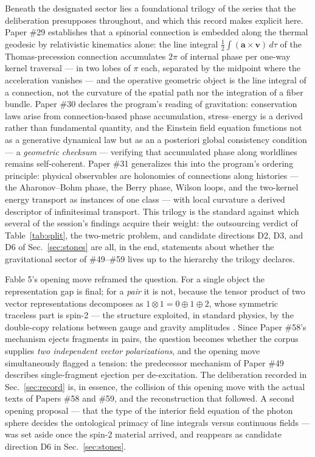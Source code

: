 \documentclass[%
 reprint, amsmath,amssymb, aps, prb, ]{revtex4-2}
\numberwithin{equation}{section}
\begin{document}
Beneath the designated sector lies a foundational trilogy of the series that the deliberation presupposes throughout, and which this record makes explicit here. Paper \#29 \cite{hanamura29} establishes that a spinorial connection is embedded along the thermal geodesic by relativistic kinematics alone: the line integral $\tfrac{1}{2}\int(\mathbf a\times\mathbf v)\,d\tau$ of the Thomas-precession connection accumulates $2\pi$ of internal phase per one-way kernel traversal --- in two lobes of $\pi$ each, separated by the midpoint where the acceleration vanishes --- and the operative geometric object is the line integral of a connection, not the curvature of the spatial path nor the integration of a fiber bundle. Paper \#30 \cite{hanamura30} declares the program's reading of gravitation: conservation laws arise from connection-based phase accumulation, stress--energy is a derived rather than fundamental quantity, and the Einstein field equation functions not as a generative dynamical law but as an a posteriori global consistency condition --- a \emph{geometric checksum} --- verifying that accumulated phase along worldlines remains self-coherent. Paper \#31 \cite{hanamura31} generalizes this into the program's ordering principle: physical observables are holonomies of connections along histories --- the Aharonov--Bohm phase, the Berry phase, Wilson loops, and the two-kernel energy transport as instances of one class --- with local curvature a derived descriptor of infinitesimal transport. This trilogy is the standard against which several of the session's findings acquire their weight: the outsourcing verdict of Table~\ref{tab:split}, the two-metric problem, and candidate directions D2, D3, and D6 of Sec.~\ref{sec:stones} are all, in the end, statements about whether the gravitational sector of \#49--\#59 lives up to the hierarchy the trilogy declares.

Fable 5's opening move reframed the question. For a single object the representation gap is final; for a \emph{pair} it is not, because the tensor product of two vector representations decomposes as $1\otimes1=0\oplus1\oplus2$, whose symmetric traceless part is spin-2 --- the structure exploited, in standard physics, by the double-copy relations between gauge and gravity amplitudes \cite{klt,bcj}. Since Paper \#58's mechanism ejects fragments in pairs, the question becomes whether the corpus supplies \emph{two independent vector polarizations}, and the opening move simultaneously flagged a tension: the predecessor mechanism of Paper \#49 describes single-fragment ejection per de-excitation. The deliberation recorded in Sec.~\ref{sec:record} is, in essence, the collision of this opening move with the actual texts of Papers \#58 and \#59, and the reconstruction that followed. A second opening proposal --- that the type of the interior field equation of the photon sphere decides the ontological primacy of line integrals versus continuous fields --- was set aside once the spin-2 material arrived, and reappears as candidate direction D6 in Sec.~\ref{sec:stones}.
\end{document}
